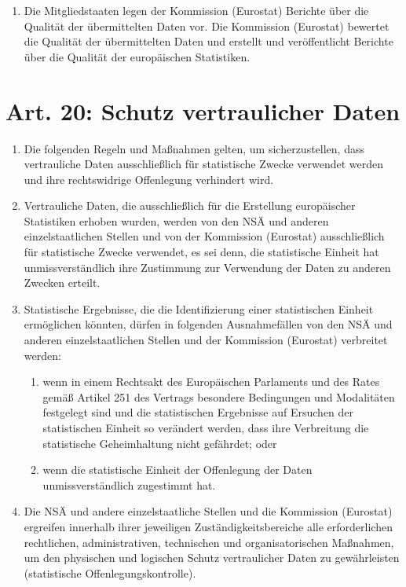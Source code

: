 \begin{enumerate}
            \item Die Mitgliedstaaten legen der Kommission (Eurostat) Berichte über die Qualität der übermittelten Daten vor. Die Kommission (Eurostat) bewertet die Qualität der übermittelten Daten und erstellt und veröffentlicht Berichte über die Qualität der europäischen Statistiken.
        \end{enumerate}
    \section{Art. 20: Schutz vertraulicher Daten}
        \begin{enumerate}
            \item Die folgenden Regeln und Maßnahmen gelten, um sicherzustellen, dass vertrauliche Daten ausschließlich für statistische Zwecke verwendet werden und ihre rechtswidrige Offenlegung verhindert wird.
            \item Vertrauliche Daten, die ausschließlich für die Erstellung europäischer Statistiken erhoben wurden, werden von den NSÄ und anderen einzelstaatlichen Stellen und von der Kommission (Eurostat) ausschließlich für statistische Zwecke verwendet, es sei denn, die statistische Einheit hat unmissverständlich ihre Zustimmung zur Verwendung der Daten zu anderen Zwecken erteilt.
            \item Statistische Ergebnisse, die die Identifizierung einer statistischen Einheit er\-mög\-lichen könnten, dürfen in folgenden Ausnahmefällen von den NSÄ und anderen einzelstaatlichen Stellen und der Kommission (Eurostat) verbreitet werden:
            \begin{enumerate}
                \item wenn in einem Rechtsakt des Europäischen Parlaments und des Rates gemäß Artikel 251 des Vertrags besondere Bedingungen und Modalitäten festgelegt sind und die statistischen Ergebnisse auf Ersuchen der statistischen Einheit so verändert werden, dass ihre Verbreitung die statistische Geheimhaltung nicht gefährdet; oder
                \item wenn die statistische Einheit der Offenlegung der Daten unmissverständlich zugestimmt hat.
            \end{enumerate}
            \item Die NSÄ und andere einzelstaatliche Stellen und die Kommission (Eurostat) ergreifen innerhalb ihrer jeweiligen Zuständigkeitsbereiche alle erforderlichen rechtlichen, administrativen, technischen und organisatorischen Maßnahmen, um den physischen und logischen Schutz vertraulicher Daten zu gewährleisten (statistische Offenlegungskontrolle).

\end{enumerate}
